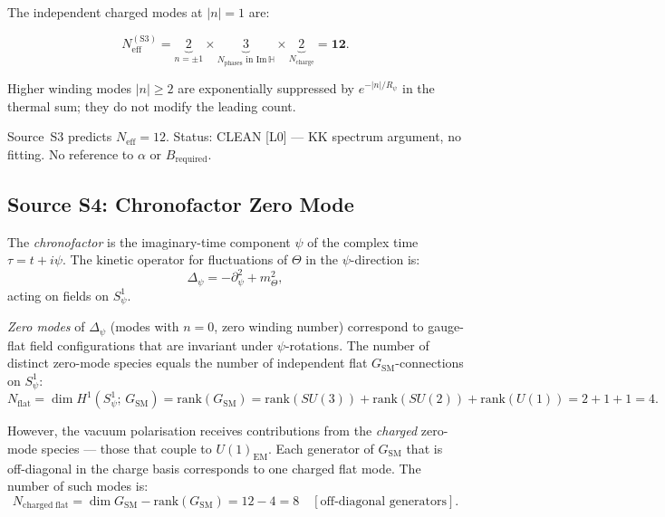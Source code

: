 \documentclass[12pt,a4paper]{article}
\theoremstyle{definition}
\theoremstyle{remark}
\begin{document}
The independent charged modes at $|n|=1$ are:

\begin{equation}
  N_{\mathrm{eff}}^{(\mathrm{S3})}
  = \underbrace{2}_{n=\pm 1}
    \times
    \underbrace{3}_{N_\mathrm{phases}\text{ in Im}\,\mathbb{H}}
    \times
    \underbrace{2}_{N_\mathrm{charge}}
  = \mathbf{12}.
  \label{eq:S3}
\end{equation}

Higher winding modes $|n|\geq 2$ are exponentially suppressed by
$e^{-|n|/R_\psi}$ in the thermal sum; they do not modify the leading count.

\begin{resultbox}
  Source~S3 predicts $N_{\mathrm{eff}} = 12$.
  Status: CLEAN [L0] — KK spectrum argument, no fitting.
  No reference to $\alpha$ or $B_{\mathrm{required}}$.
\end{resultbox}

\subsection{Source S4: Chronofactor Zero Mode}
\label{ssec:S4}

The \textit{chronofactor} is the imaginary-time component $\psi$ of the complex
time $\tau = t + i\psi$.  The kinetic operator for fluctuations of $\Theta$ in
the $\psi$-direction is:
\begin{equation}
  \Delta_\psi = -\partial^2_\psi + m^2_\Theta,
\end{equation}
acting on fields on $S^1_\psi$.

\textit{Zero modes} of $\Delta_\psi$ (modes with $n=0$, zero winding number)
correspond to gauge-flat field configurations that are invariant under
$\psi$-rotations.  The number of distinct zero-mode species equals the number
of independent flat $G_{\mathrm{SM}}$-connections on $S^1_\psi$:
\begin{equation}
  N_{\mathrm{flat}} = \dim H^1(S^1_\psi;\, G_{\mathrm{SM}})
                    = \mathrm{rank}(G_{\mathrm{SM}})
                    = \mathrm{rank}(SU(3)) + \mathrm{rank}(SU(2)) + \mathrm{rank}(U(1))
                    = 2 + 1 + 1 = 4.
\end{equation}

However, the vacuum polarisation receives contributions from the \textit{charged}
zero-mode species — those that couple to $U(1)_{\mathrm{EM}}$.  Each generator
of $G_{\mathrm{SM}}$ that is off-diagonal in the charge basis corresponds to one
charged flat mode.  The number of such modes is:
\begin{equation}
  N_{\mathrm{charged\;flat}}
  = \dim G_{\mathrm{SM}} - \mathrm{rank}(G_{\mathrm{SM}})
  = 12 - 4 = 8 \quad [\text{off-diagonal generators}].
\end{equation}
\end{document}
